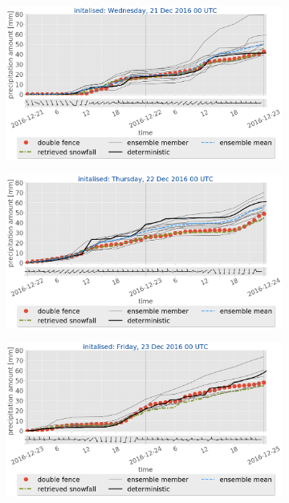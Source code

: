 \begin{figure}[H]
	\centering
	\begin{subfigure}[t]{0.97\textwidth}		\includegraphics[trim={0.cm 5.2cm 0.cm 0cm},clip,width=\textwidth]{./fig_sfc_acc/acc_wind_20161221_00}
		\caption{}\label{fig:sfc_acc21}
	\end{subfigure}
	\begin{subfigure}[t]{0.97\textwidth}		\includegraphics[trim={0.cm 5.2cm 0.cm 0cm},clip,width=\textwidth]{./fig_sfc_acc/acc_wind_20161222_00}
		\caption{}\label{fig:sfc_acc22}
	\end{subfigure}
	\begin{subfigure}[t]{0.97\textwidth}	\includegraphics[trim={0.cm 5.2cm 0.cm 0cm},clip,width=\textwidth]{./fig_sfc_acc/acc_wind_20161223_00}

\end{subfigure}
\end{figure}
